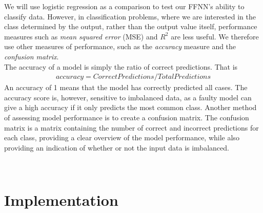 \documentclass[english,notitlepage,reprint,nofootinbib]{revtex4-1}  %
\begin{document}
We will use logistic regression as a comparison to test our FFNN's ability to classify data. However, in classification problems, where we are interested in the class determined by the output, rather than the output value itself, performance measures such as \textit{mean squared error} (MSE) and \textit{$R^2$} are less useful. We therefore use other measures of performance, such as the \textit{accuracy} measure and the \textit{confusion matrix}. 
\\
The accuracy of a model is simply the ratio of correct predictions. That is
\begin{align}
    accuracy = Correct Predictions / Total Predictions
\end{align}
An accuracy of 1 means that the model has correctly predicted all cases. The accuracy score is, however, sensitive to imbalanced data, as a faulty model can give a high accuracy if it only predicts the most common class. Another method of assessing model performance is to create a confusion matrix. The confusion matrix is a matrix containing the number of correct and incorrect predictions for each class, providing a clear overview of the model performance, while also providing an indication of whether or not the input data is imbalanced. 

\\



\section{Implementation}\label{sec:IMPLEMENTATION}
\end{document}
